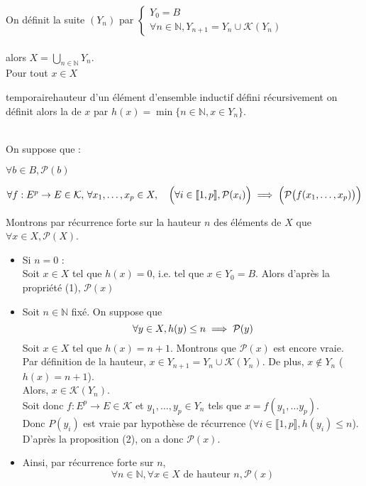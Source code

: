 \begin{demonstration}
    On définit la suite $(Y_n)$ par $\begin{cases}
        Y_0 =  B \\
        \forall n \in \mathbb{N}, Y_{n+1} = Y_n \cup \mathcal{K}(Y_n)
    \end{cases}$ \\ \\
    alors $X = \bigcup_{n \in \mathbb{N}}Y_n$. \\ Pour tout $x \in X$
    \begin{definition}{temporaire}{hauteur d'un élément d'ensemble inductif défini récursivement}
        on définit alors la  de $x$ par $h(x) = \min \{n \in \mathbb{N}, x \in Y_n\}$.
    \end{definition}\\
    On suppose que : \begin{enumeratebf}
        \item $\forall b \in B, \mathcal{P}(b)$
        \item $\forall f : E^p \rightarrow E \in \mathcal{K}, \, \forall x_1,\ldots, x_p \in X, \quad \Bigl(\forall i \in \llbracket 1,p \rrbracket, \mathcal{P}(x_i)\Bigr) \implies \Bigl(\mathcal{P}\bigl(f(x_1,\ldots,x_p)\bigr)\Bigr)$
    \end{enumeratebf}
    Montrons par récurrence forte sur la hauteur $n$ des éléments de $X$ que $\forall x \in X, \mathcal{P}(X)$.
    \begin{itemize}
        \item Si $n = 0$ : \\Soit $x \in X$ tel que $h(x) = 0$, i.e. tel que $x \in Y_0 = B$. Alors d'après la propriété (1), $\mathcal{P}(x)$
        \item Soit $n \in \mathbb{N}$ fixé. On suppose que $$\forall y \in X, h(y) \leq n \implies \mathcal{P}(y)$$ Soit $x \in X$ tel que $h(x) = n+1$. Montrons que $\mathcal{P}(x)$ est encore vraie.\\Par définition de la hauteur, $x \in Y_{n+1} = Y_{n} \cup \mathcal{K}(Y_n)$. De plus, $x \notin Y_n$ ($h(x) = n+1$).\\Alors, $x \in \mathcal{K}(Y_n)$.\\Soit donc $f : E^p \rightarrow E \in \mathcal{K}$ et $y_1, \ldots, y_p \in Y_n$ tels que $x = f(y_1,\ldots y_p)$.\\Donc $P(y_i)$ est vraie par hypothèse de récurrence ($\forall i \in \llbracket 1,p \rrbracket, h(y_i) \leq n$).\\D'après la proposition (2), on a donc $\mathcal{P}(x)$. 
        \item Ainsi, par récurrence forte sur $n$, $$\forall n \in \mathbb{N}, \forall x \in X \text{ de hauteur } n, \mathcal{P}(x)$$
    \end{itemize}
\end{demonstration}
